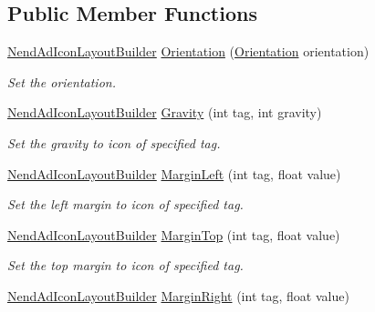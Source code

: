 \subsection*{Public Member Functions}
\begin{DoxyCompactItemize}
\item 
\hyperlink{class_nend_unity_plugin_1_1_layout_1_1_nend_ad_icon_layout_builder}{Nend\+Ad\+Icon\+Layout\+Builder} \hyperlink{class_nend_unity_plugin_1_1_layout_1_1_nend_ad_icon_layout_builder_a135d4506318158ed562cebc17e28d301}{Orientation} (\hyperlink{namespace_nend_unity_plugin_1_1_common_af66c0e2b8ebbf19f10df658ba51d5962}{Orientation} orientation)
\begin{DoxyCompactList}\small\item\em Set the orientation. \end{DoxyCompactList}\item 
\hyperlink{class_nend_unity_plugin_1_1_layout_1_1_nend_ad_icon_layout_builder}{Nend\+Ad\+Icon\+Layout\+Builder} \hyperlink{class_nend_unity_plugin_1_1_layout_1_1_nend_ad_icon_layout_builder_ad1c80ced5a59145158f73dce767069ff}{Gravity} (int tag, int gravity)
\begin{DoxyCompactList}\small\item\em Set the gravity to icon of specified tag. \end{DoxyCompactList}\item 
\hyperlink{class_nend_unity_plugin_1_1_layout_1_1_nend_ad_icon_layout_builder}{Nend\+Ad\+Icon\+Layout\+Builder} \hyperlink{class_nend_unity_plugin_1_1_layout_1_1_nend_ad_icon_layout_builder_a32f70beaa7d794eeebc869a28ffd4a5e}{Margin\+Left} (int tag, float value)
\begin{DoxyCompactList}\small\item\em Set the left margin to icon of specified tag. \end{DoxyCompactList}\item 
\hyperlink{class_nend_unity_plugin_1_1_layout_1_1_nend_ad_icon_layout_builder}{Nend\+Ad\+Icon\+Layout\+Builder} \hyperlink{class_nend_unity_plugin_1_1_layout_1_1_nend_ad_icon_layout_builder_aefcf89ef7fe5a5d4d87aa789a4ece845}{Margin\+Top} (int tag, float value)
\begin{DoxyCompactList}\small\item\em Set the top margin to icon of specified tag. \end{DoxyCompactList}\item 
\hyperlink{class_nend_unity_plugin_1_1_layout_1_1_nend_ad_icon_layout_builder}{Nend\+Ad\+Icon\+Layout\+Builder} \hyperlink{class_nend_unity_plugin_1_1_layout_1_1_nend_ad_icon_layout_builder_afc17b074adf0768a75b02e976ac04656}{Margin\+Right} (int tag, float value)

\end{DoxyCompactItemize}
